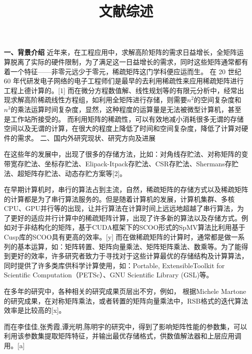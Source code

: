 \documentclass{article}
\begin{document}
  

\title{文献综述}
\date{}

\maketitle


\textbf{一、背景介绍}
      \qquad
\newline
      \qquad
      近年来，在工程应用中，求解高阶矩阵的需求日益增长，全矩阵运算脱离了实际的硬件限制，为了满足这一日益增长的需求，同时这些矩阵通常都有着一个特征——非零元远少于零元，稀疏矩阵这门学科便应运而生。
在 20 世纪 60 年代研发电子网络的电子工程师们是最早的去利用稀疏性来应用稀疏矩阵进行工程上德计算的。[1]
而在微分方程数值解、线性规划等的有限元分析中，经常出现求解高阶稀疏线性方程组，如利用全矩阵进行存储，则需要$n^2$的空间复杂度和$n^3$的乘法运算时间复杂度，显然，这种程度的运算量是无法被微型计算机，甚至是工作站所接受的。
而利用矩阵的稀疏性，可以有效地减小消耗很多无谓的存储空间以及无谓的计算，在很大的程度上降低了时间和空间复杂度，降低了计算对硬件的需求。
\newline
二、国内外研究现状、研究方向及进展\newline

在这些年的发展中，出现了很多的存储方法，比如：对角线存贮法、对称矩阵的变带宽存贮法、坐标存贮法、Elipack-Itpack存贮法、CSR存贮法、Shermans存贮法、超矩阵存贮法、动态存贮方案等[2]。



在早期计算机时，串行的算法占到主流，自然，稀疏矩阵的存储方式以及稀疏矩阵的计算都是为了串行算法服务的。但是随着计算机的发展，计算机集群、多核CPU、GPU并行等的出现，让并行算法在计算时间上远远地超越了串行算法，为了更好的适应并行计算中的稀疏矩阵计算，出现了许多新的算法以及存储方式。例如对于非结构化的矩阵，基于CUDA框架下的SCOO形式的SpMV算法比利用基于Cusp库的SCOO具有更高的效率。[y]
\newline
而在做稀疏矩阵的计算时，通常都是做一系列的基本运算，如：矩阵转置、矩阵向量乘法、矩阵矩阵乘法、数乘等。为了能得到更好的效率，许多研究者致力于寻找对于这些计算最优的存储结构及计算算法，同时提供了许多类库供科学计算使用，如：Portable, ExtensibleToolkit for Scientific Computation（PETSc）、GNU Scientific Library (GSL)等。

在多年的研究中，各种相关的研究成果页层出不穷，例如，
根据Michele Martone的研究成果，在对称矩阵乘法，或者转置的矩阵向量乘法中，RSB格式的迭代算法效率是比较高的[x]。

而在李佳佳,张秀霞,谭光明,陈明宇的研究中，得到了影响矩阵性能的参数集，可以利用该参数集提取矩阵特征，并输出最优存储格式，供数值解法器和上层应用调用。[a]
\end{document}
